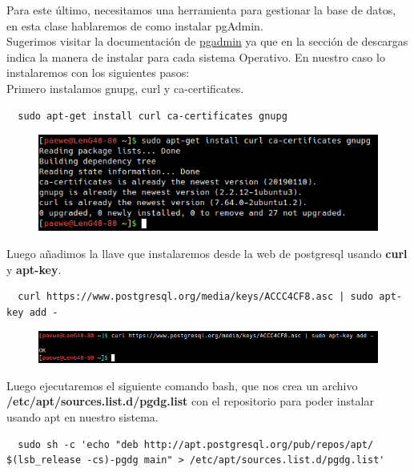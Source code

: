 \documentclass{article}
\begin{document}
Para este último, necesitamos una herramienta para gestionar la base de datos,
en esta clase hablaremos de como instalar pgAdmin.\\

Sugerimos visitar la documentación de
\href{https://www.pgadmin.org/docs/}{pgadmin} ya que en la sección de descargas
indica la manera de instalar para cada sistema Operativo. En nuestro caso lo
instalaremos con los siguientes pasos:\\

Primero instalamos gnupg, curl y ca-certificates.
\begin{verbatim}
  sudo apt-get install curl ca-certificates gnupg
\end{verbatim}

\begin{figure}[h!]
  \centering
  \includegraphics[scale=0.5]{./Pictures/259_gnupg_curl_certificates.png}
\end{figure}

Luego añadimos la llave que instalaremos desde la web de postgresql usando
\textbf{curl} y \textbf{apt-key}.

\begin{verbatim}
  curl https://www.postgresql.org/media/keys/ACCC4CF8.asc | sudo apt-key add -
\end{verbatim}

\begin{figure}[h!]
  \centering
  \includegraphics[scale=0.5]{./Pictures/260_add_key.png}
\end{figure}

Luego ejecutaremos el siguiente comando bash, que nos crea un archivo
\textbf{/etc/apt/sources.list.d/pgdg.list} con el repositorio para poder
instalar usando apt en nuestro sistema.

\begin{verbatim}
  sudo sh -c 'echo "deb http://apt.postgresql.org/pub/repos/apt/ $(lsb_release -cs)-pgdg main" > /etc/apt/sources.list.d/pgdg.list'
\end{verbatim}
\end{document}
